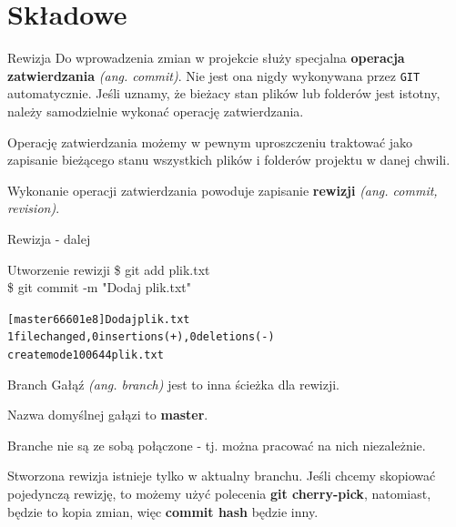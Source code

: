 \documentclass{beamer}
\begin{document}

\section{Składowe}

\begin{frame}{Rewizja}
Do wprowadzenia zmian w projekcie służy specjalna \textbf{operacja zatwierdzania} \textit{(ang. commit)}. Nie jest ona nigdy wykonywana przez \texttt{GIT} automatycznie. Jeśli uznamy, że bieżacy stan plików lub folderów jest istotny, należy samodzielnie wykonać operację zatwierdzania.

\vskip 0.5cm
Operację zatwierdzania możemy w pewnym uproszczeniu traktować jako zapisanie bieżącego stanu wszystkich plików i folderów 
projektu w danej chwili.

\vskip 0.5cm
Wykonanie operacji zatwierdzania powoduje zapisanie \textbf{rewizji} \textit{(ang. commit, revision)}.
\end{frame}

\begin{frame}{Rewizja - dalej}
\begin{block}{Utworzenie rewizji}
\$ git add plik.txt \\
\$ git commit -m "Dodaj plik.txt"
\begin{alltt}
[master 66601e8] Dodaj plik.txt \\ 
 1 file changed, 0 insertions(+), 0 deletions(-) \\
 create mode 100644 plik.txt
\end{alltt}
\end{block}
\end{frame}

\begin{frame}{Branch}
Gałąź \textit{(ang. branch)} jest to inna ścieżka dla rewizji.

Nazwa domyślnej gałązi to \textbf{master}.

Branche nie są ze sobą połączone - tj. można pracować na nich niezależnie.

Stworzona rewizja istnieje tylko w aktualny branchu.
Jeśli chcemy skopiować pojedynczą rewizję, to możemy użyć polecenia \textbf{git cherry-pick},
natomiast, będzie to kopia zmian, więc \textbf{commit hash} będzie inny.
\end{frame}
\end{document}
